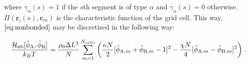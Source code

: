 \documentclass[bachelor,       %
               twoside,        %
               BCOR10mm,       %
               ngerman, english %
               ]{GAUBM}
\begin{document}
where $\gamma_\alpha(s)=1$ if the $s$th segment is of type $\alpha$ and $\gamma_\alpha(s)=0$ otherwise. $\Pi(\mathbf r_i(s),\mathbf c_m)$ is the characteristic function of the grid cell. This way, $\eqref{eq:nonbonded}$ may be discretized in the following way:

\begin{align}
    \frac{\mathcal H_\text{nb}[\hat\phi_\text A,\hat\phi_\text B]}{k_BT}=\frac{\rho_0\Delta L^3}{N}\sum_{m=1}^{N_{cells}}\left(\frac{\kappa N}{2}[\hat\phi_{\text A,m}+\hat\phi_{\text B,m}-1]^2-\frac{\chi N}{4}[\hat\phi_{\text A,m}-\hat\phi_{\text B,m}]^2\right)\,.
\end{align}







\end{document}
